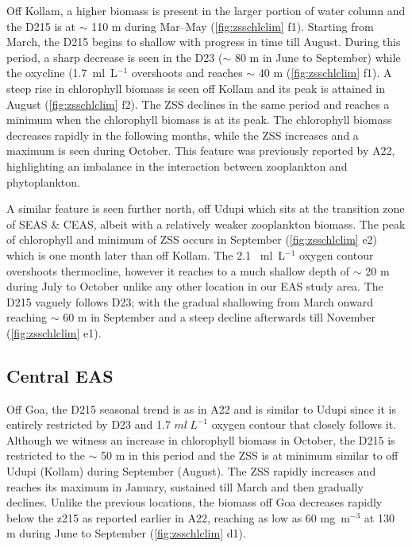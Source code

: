 \documentclass{article}
\begin{document}
	Off Kollam, a higher biomass is present in the larger portion of water column and the D215 is at $\sim$ 110 m during Mar--May (\cref{fig:zsschlclim} f1). Starting from March, the D215 begins to shallow with progress in time till August. During this period, a sharp decrease is seen in the D23 ($\sim$ 80 m in June to September) while the oxycline (1.7~ml~L$^{-1}$ overshoots and reaches $\sim$ 40 m (\cref{fig:zsschlclim} f1). A steep rise in chlorophyll biomass is seen off Kollam and its peak is attained in August (\cref{fig:zsschlclim} f2). The ZSS declines in the same period and reaches a minimum when the chlorophyll biomass is at its peak. The chlorophyll biomass decreases rapidly in the following months, while the ZSS increases and a maximum is seen during October. This feature was previously reported by A22, highlighting an imbalance in the interaction between zooplankton and phytoplankton.
	
	A similar feature is seen further north, off Udupi which sits at the transition zone of SEAS \& CEAS, albeit with a relatively weaker zooplankton biomass. The peak of chlorophyll and minimum of ZSS occurs in September (\cref{fig:zsschlclim} e2) which is one month later than off Kollam. The 2.1 ~ml~L$^{-1}$  oxygen contour overshoots thermocline, however it reaches to a much shallow depth of $\sim$ 20 m during July to October unlike any other location in our EAS study area. The D215 vaguely follows D23; with the gradual shallowing from March onward reaching $\sim$ 60 m in September and a steep decline afterwards till November (\cref{fig:zsschlclim} e1).

	\subsection{Central EAS}
	Off Goa, the D215 seasonal trend is as in A22 and is similar to Udupi since it is entirely restricted by D23 and 1.7 $ml \ L^{-1}$ oxygen contour that closely follows it. 
	Although we witness an increase in chlorophyll biomass in October, the D215 is restricted to the $\sim$ 50 m in this period  and the ZSS is at minimum  similar to off Udupi (Kollam) during September (August). The ZSS rapidly increases and reaches its maximum in January, sustained till March and then gradually declines. Unlike the previous locations, the biomass off Goa decreases rapidly below the z215 as reported earlier in A22, reaching as low as 60 mg~m$^{-3}$ at 130 m during June to September (\cref{fig:zsschlclim} d1).
	 
\end{document}
